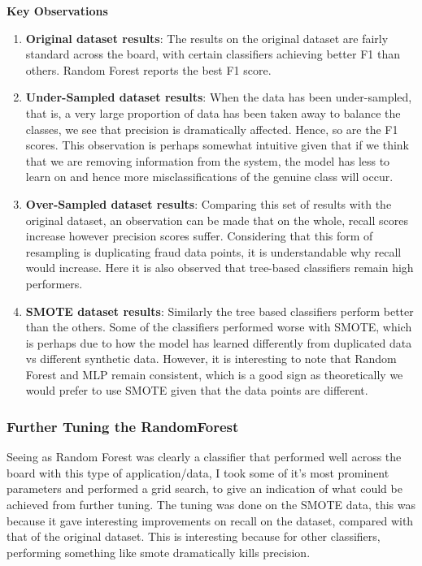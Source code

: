 \documentclass[12pt,a4paper,twoside]{report}
\begin{document}
\pagebreak
\textbf{Key Observations}
\begin{enumerate}
\item \textbf{Original dataset results}: The results on the original dataset are fairly standard across the board, with certain classifiers achieving better F1 than others. Random Forest reports the best F1 score. 

\item \textbf{Under-Sampled dataset results}: When the data has been under-sampled, that is, a very large proportion of data has been taken away to balance the classes, we see that precision is dramatically affected. Hence, so are the F1 scores. This observation is perhaps somewhat intuitive given that if we think that we are removing information from the system, the model has less to learn on and hence more misclassifications of the genuine class will occur. 

\item \textbf{Over-Sampled dataset results}: Comparing this set of results with the original dataset, an observation can be made that on the whole, recall scores increase however precision scores suffer. Considering that this form of resampling is duplicating fraud data points, it is understandable why recall would increase. Here it is also observed that tree-based classifiers remain high performers. 

\item \textbf{SMOTE dataset results}: Similarly the tree based classifiers perform better than the others. Some of the classifiers performed worse with SMOTE, which is perhaps due to how the model has learned differently from duplicated data vs different synthetic data. However, it is interesting to note that Random Forest and MLP remain consistent, which is a good sign as theoretically we would prefer to use SMOTE given that the data points are different. 
 
\end{enumerate}

\subsubsection{Further Tuning the RandomForest }
Seeing as Random Forest was clearly a classifier that performed well across the board with this type of application/data, I took some of it's most prominent parameters and performed a grid search, to give an indication of what could be achieved from further tuning. The tuning was done on the SMOTE data, this was because it gave interesting improvements on recall on the dataset, compared with that of the original dataset. This is interesting because for other classifiers, performing something like smote dramatically kills precision. 
\end{document}

